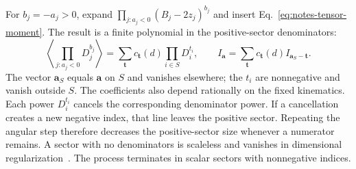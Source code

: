 For $b_j=-a_j>0$, expand $\prod_{j:a_j<0}(B_j-2z_j)^{b_j}$ and insert Eq.~\eqref{eq:notes-tensor-moment}. The result is a finite polynomial in the positive-sector denominators:
\begin{equation}
 \left\langle\prod_{j:a_j<0}D_j^{b_j}\right\rangle
 =\sum_{\boldsymbol t}c_{\boldsymbol t}(d)\prod_{i\in S}D_i^{t_i},
 \qquad
 I_{\boldsymbol a}=\sum_{\boldsymbol t}c_{\boldsymbol t}(d)
 I_{\boldsymbol a_S-\boldsymbol t}.
 \label{eq:notes-tensor-expansion}
\end{equation}
The vector $\boldsymbol a_S$ equals $\boldsymbol a$ on $S$ and vanishes elsewhere; the $t_i$ are nonnegative and vanish outside $S$. The coefficients also depend rationally on the fixed kinematics. Each power $D_i^{t_i}$ cancels the corresponding denominator power. If a cancellation creates a new negative index, that line leaves the positive sector. Repeating the angular step therefore decreases the positive-sector size whenever a numerator remains. A sector with no denominators is scaleless and vanishes in dimensional regularization~\cite{Weinzierl2022}. The process terminates in scalar sectors with nonnegative indices.

